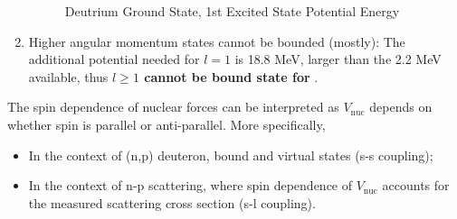 \documentclass{school-22.101-notes}
\begin{document}
\begin{enumerate}
\begin{figure}
    \centering
    \caption{Deutrium Ground State, 1st Excited State Potential Energy}    \label{deuteron-bound}
\end{figure}

\item Higher angular momentum states cannot be bounded (mostly):
The additional potential needed for $l=1$ is 18.8 MeV, larger than the 2.2 MeV available, thus \textbf{$l \ge 1$ cannot be bound state for }. 
\end{enumerate}


The spin dependence of nuclear forces can be interpreted as $V_{\mathrm{nuc}}$ depends on whether spin is parallel or anti-parallel. More specifically, 
\begin{itemize}
    \item In the context of (n,p) deuteron, bound and virtual states (s-s coupling);
    \item In the context of n-p scattering, where spin dependence of $V_{\mathrm{nuc}}$ accounts for the measured scattering cross section (s-l coupling). 
\end{itemize}
\end{document}
